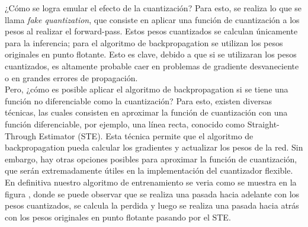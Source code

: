 ¿Cómo se logra emular el efecto de la cuantización? Para esto, se realiza lo que se llama \textit{fake quantization}, que consiste en aplicar una función de cuantización a los pesos al realizar el forward-pass. Estos pesos cuantizados se calculan únicamente para la inferencia; para el algoritmo de backpropagation se utilizan los pesos originales en punto flotante. Esto es clave, debido a que si se utilizaran los pesos cuantizados, es altamente probable caer en problemas de gradiente desvaneciente o en grandes errores de propagación. \\

Pero, ¿cómo es posible aplicar el algoritmo de backpropagation si se tiene una función no diferenciable como la cuantización? Para esto, existen diversas técnicas, las cuales consisten en aproximar la función de cuantización con una función diferenciable, por ejemplo, una línea recta, conocido como Straight-Through Estimator (STE). Esta técnica permite que el algoritmo de backpropagation pueda calcular los gradientes y actualizar los pesos de la red. Sin embargo, hay otras opciones posibles para aproximar la función de cuantización, que serán extremadamente útiles en la implementación del cuantizador flexible. \\

En definitiva nuestro algoritmo de entrenamiento se veria como se muestra en la figura , donde se puede observar que se realiza una pasada hacia adelante con los pesos cuantizados, se calcula la perdida y luego se realiza una pasada hacia atrás con los pesos originales en punto flotante pasando por el STE. \\

